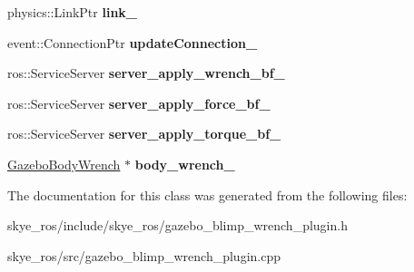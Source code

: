 \begin{DoxyCompactItemize}
\item 
\hypertarget{classgazebo_1_1_gazebo_blimp_wrench_plugin_a4fee8aac766ecbbf26c68776efd48bec}{physics\-::\-Link\-Ptr {\bfseries link\-\_\-}}\label{classgazebo_1_1_gazebo_blimp_wrench_plugin_a4fee8aac766ecbbf26c68776efd48bec}

\item 
\hypertarget{classgazebo_1_1_gazebo_blimp_wrench_plugin_afd2cca05fd37109c075987ab836fa16a}{event\-::\-Connection\-Ptr {\bfseries update\-Connection\-\_\-}}\label{classgazebo_1_1_gazebo_blimp_wrench_plugin_afd2cca05fd37109c075987ab836fa16a}

\item 
\hypertarget{classgazebo_1_1_gazebo_blimp_wrench_plugin_a96b17df9675778f1b88d521bd3c57285}{ros\-::\-Service\-Server {\bfseries server\-\_\-apply\-\_\-wrench\-\_\-bf\-\_\-}}\label{classgazebo_1_1_gazebo_blimp_wrench_plugin_a96b17df9675778f1b88d521bd3c57285}

\item 
\hypertarget{classgazebo_1_1_gazebo_blimp_wrench_plugin_a24abb65b507037e39496e0a547fff35e}{ros\-::\-Service\-Server {\bfseries server\-\_\-apply\-\_\-force\-\_\-bf\-\_\-}}\label{classgazebo_1_1_gazebo_blimp_wrench_plugin_a24abb65b507037e39496e0a547fff35e}

\item 
\hypertarget{classgazebo_1_1_gazebo_blimp_wrench_plugin_aba3ea147fbe414d75290965c091ed3da}{ros\-::\-Service\-Server {\bfseries server\-\_\-apply\-\_\-torque\-\_\-bf\-\_\-}}\label{classgazebo_1_1_gazebo_blimp_wrench_plugin_aba3ea147fbe414d75290965c091ed3da}

\item 
\hypertarget{classgazebo_1_1_gazebo_blimp_wrench_plugin_a68fe0801ac4b3f9ccdd3fa573bf2147e}{\hyperlink{classgazebo_1_1_gazebo_body_wrench}{Gazebo\-Body\-Wrench} $\ast$ {\bfseries body\-\_\-wrench\-\_\-}}\label{classgazebo_1_1_gazebo_blimp_wrench_plugin_a68fe0801ac4b3f9ccdd3fa573bf2147e}

\end{DoxyCompactItemize}


The documentation for this class was generated from the following files\-:\begin{DoxyCompactItemize}
\item 
skye\-\_\-ros/include/skye\-\_\-ros/gazebo\-\_\-blimp\-\_\-wrench\-\_\-plugin.\-h\item 
skye\-\_\-ros/src/gazebo\-\_\-blimp\-\_\-wrench\-\_\-plugin.\-cpp\end{DoxyCompactItemize}
